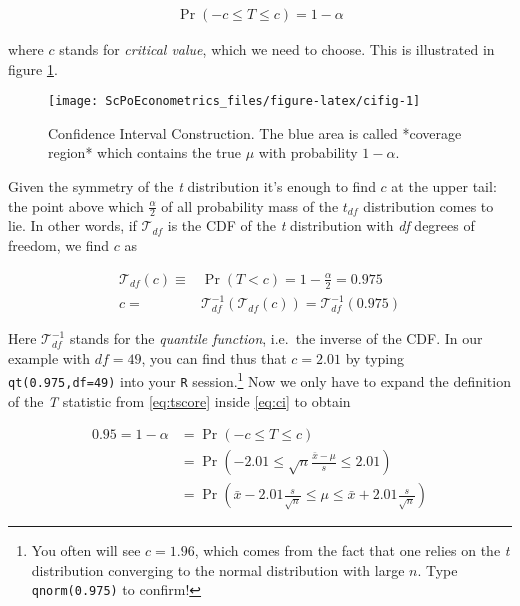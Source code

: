 \documentclass[]{book}
\let\rmarkdownfootnote\footnote%
\def\footnote{\protect\rmarkdownfootnote}
\begin{document}
\begin{align}
\Pr \left(-c \leq T \leq c \right) = 1-\alpha \label{eq:ci}
\end{align}

where \(c\) stands for \emph{critical value}, which we need to choose.
This is illustrated in figure \ref{fig:cifig}.

\begin{figure}

{\centering \texttt{[image: ScPoEconometrics\_files/figure-latex/cifig-1]} 

}

\caption{Confidence Interval Construction. The blue area is called *coverage region* which contains the true $\mu$ with probability $1-\alpha$.}\label{fig:cifig}
\end{figure}

Given the symmetry of the \emph{t} distribution it's enough to find
\(c\) at the upper tail: the point above which \(\frac{\alpha}{2}\) of
all probability mass of the \(t_{df}\) distribution comes to lie. In
other words, if \(\mathcal{T}_{df}\) is the CDF of the \emph{t}
distribution with \emph{df} degrees of freedom, we find \(c\) as

\begin{align}
\mathcal{T}_{df}(c)\equiv& \Pr \left( T < c \right)  = 1-\frac{\alpha}{2} = 0.975 \\\label{eq:ci1}
c =& \mathcal{T}_{df}^{-1}(\mathcal{T}_{df}(c)) = \mathcal{T}_{df}^{-1}(0.975)
\end{align}

Here \(\mathcal{T}_{df}^{-1}\) stands for the \emph{quantile function},
i.e.~the inverse of the CDF. In our example with \(df = 49\), you can
find thus that \(c = 2.01\) by typing \texttt{qt(0.975,df=49)} into your
\texttt{R} session.\footnote{You often will see \(c=1.96\), which comes
  from the fact that one relies on the \emph{t} distribution converging
  to the normal distribution with large \(n\). Type
  \texttt{qnorm(0.975)} to confirm!} Now we only have to expand the
definition of the \emph{T} statistic from \eqref{eq:tscore} inside
\eqref{eq:ci} to obtain

\begin{align}
0.95 = 1-\alpha &= \Pr \left(-c \leq T \leq c \right) \\\label{eq:ci2}
                &= \Pr \left(-2.01 \leq \sqrt{n} \frac{\bar{x} - \mu}{s} \leq 2.01 \right) \\
                 &= \Pr \left(\bar{x} -2.01 \frac{s}{\sqrt{n}} \leq \mu \leq \bar{x} + 2.01 \frac{s}{\sqrt{n}} \right) 
\end{align}
\end{document}
